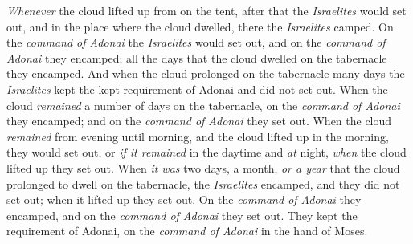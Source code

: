 \begin{biblechapter}
\verse \textit{Whenever} the cloud lifted up from on the tent, after that the \textit{Israelites} would set out, and in the place where the cloud dwelled, there the \textit{Israelites} camped.
\verse On the \textit{command of Adonai} the \textit{Israelites} would set out, and on the \textit{command of Adonai} they encamped; all the days that the cloud dwelled on the tabernacle they encamped.
\verse And when the cloud prolonged on the tabernacle many days the \textit{Israelites} kept the kept requirement of Adonai and did not set out.
\verse When the cloud \textit{remained} a number of days on the tabernacle, on the \textit{command of Adonai} they encamped; and on the \textit{command of Adonai} they set out.
\verse When the cloud \textit{remained} from evening until morning, and the cloud lifted up in the morning, they would set out, or \textit{if it remained} in the daytime and \textit{at} night, \textit{when} the cloud lifted up they set out.
\verse When \textit{it was} two days, a month, \textit{or a year} that the cloud prolonged to dwell on the tabernacle, the \textit{Israelites} encamped, and they did not set out; when it lifted up they set out.
\verse On the \textit{command of Adonai} they encamped, and on the \textit{command of Adonai} they set out. They kept the requirement of Adonai, on the \textit{command of Adonai} in the hand of Moses.
\end{biblechapter}

